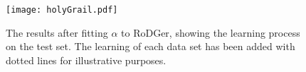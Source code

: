 \begin{figure}[H]
    \begin{center}
        \texttt{[image: holyGrail.pdf]}
        \caption[RoDGer Test Results]{The results after fitting $\alpha{}$ to RoDGer, showing the learning process on the test set. The learning of each data set has been added with dotted lines for illustrative purposes.}
        \label{fig:holyTrinity}
    \end{center}
\end{figure}

